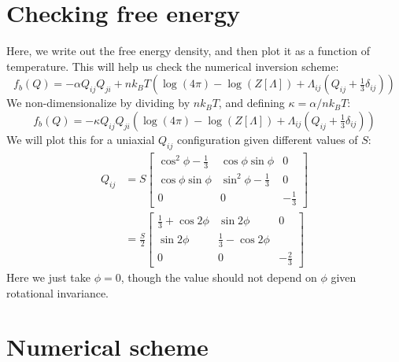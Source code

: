 \documentclass[reqno]{article}
\begin{document}
	\section{Checking free energy}
	Here, we write out the free energy density, and then plot it as a function of temperature.
	This will help us check the numerical inversion scheme:
	\begin{equation}
		f_b(Q)
		= -\alpha Q_{ij} Q_{ji}
		+ n k_B T \left(
			\log(4 \pi)
			- \log(Z[\Lambda])
			+ \Lambda_{ij}(Q_{ij} + \tfrac13 \delta_{ij})
		\right)
	\end{equation}
	We non-dimensionalize by dividing by $n k_B T$, and defining $\kappa = \alpha / n k_B T$:
	\begin{equation}
		f_b(Q)
		= -\kappa Q_{ij} Q_{ji}
		\left(
			\log(4 \pi)
			- \log(Z[\Lambda])
			+ \Lambda_{ij}(Q_{ij} + \tfrac13 \delta_{ij})
		\right)
	\end{equation}
	We will plot this for a uniaxial $Q_{ij}$ configuration given different values of $S$:
	\begin{equation}
	\begin{split}
		Q_{ij}
		&=
		S
		\begin{bmatrix}
			\cos^2 \phi - \tfrac13 &\cos\phi \sin\phi &0 \\
			\cos\phi \sin\phi &\sin^2\phi - \tfrac13 &0 \\
			0 &0 &-\tfrac13
		\end{bmatrix} \\
		&=
		\frac{S}{2}
		\begin{bmatrix}
			\tfrac13 + \cos2\phi &\sin2\phi &0 \\
			\sin2\phi &\tfrac13 - \cos2\phi \\
			0 &0 &-\tfrac23
		\end{bmatrix}
	\end{split}
	\end{equation}
	Here we just take $\phi = 0$, though the value should not depend on $\phi$ given rotational invariance.
	
	\section{Numerical scheme}
\end{document}
